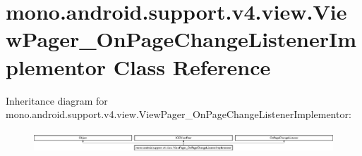 \hypertarget{classmono_1_1android_1_1support_1_1v4_1_1view_1_1ViewPager__OnPageChangeListenerImplementor}{}\section{mono.\+android.\+support.\+v4.\+view.\+View\+Pager\+\_\+\+On\+Page\+Change\+Listener\+Implementor Class Reference}
\label{classmono_1_1android_1_1support_1_1v4_1_1view_1_1ViewPager__OnPageChangeListenerImplementor}
Inheritance diagram for mono.\+android.\+support.\+v4.\+view.\+View\+Pager\+\_\+\+On\+Page\+Change\+Listener\+Implementor\+:\begin{figure}[H]
\begin{center}
\leavevmode
\includegraphics[height=0.801144cm]{classmono_1_1android_1_1support_1_1v4_1_1view_1_1ViewPager__OnPageChangeListenerImplementor}
\end{center}
\end{figure}
